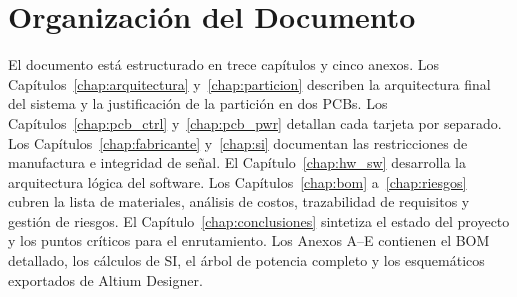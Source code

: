 \section{Organización del Documento}
\label{sec:intro_organizacion}

El documento está estructurado en trece capítulos y cinco anexos. Los Capítulos~\ref{chap:arquitectura} y~\ref{chap:particion} describen la arquitectura final del sistema y la justificación de la partición en dos PCBs. Los Capítulos~\ref{chap:pcb_ctrl} y~\ref{chap:pcb_pwr} detallan cada tarjeta por separado. Los Capítulos~\ref{chap:fabricante} y~\ref{chap:si} documentan las restricciones de manufactura e integridad de señal. El Capítulo~\ref{chap:hw_sw} desarrolla la arquitectura lógica del software. Los Capítulos~\ref{chap:bom} a~\ref{chap:riesgos} cubren la lista de materiales, análisis de costos, trazabilidad de requisitos y gestión de riesgos. El Capítulo~\ref{chap:conclusiones} sintetiza el estado del proyecto y los puntos críticos para el enrutamiento. Los Anexos A--E contienen el BOM detallado, los cálculos de SI, el árbol de potencia completo y los esquemáticos exportados de Altium Designer.
